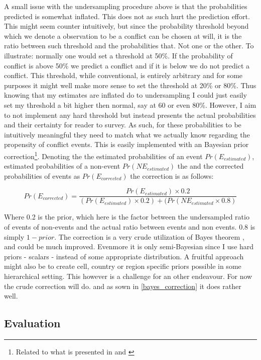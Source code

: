 \documentclass[a4paper]{article}
\begin{document}
A small issue with the undersampling procedure above is that the probabilities predicted is somewhat inflated. This does not as such hurt the prediction effort. This might seem counter intuitively, but since the probability threshold beyond which we denote a observation to be a conflict can be chosen at will, it is the ratio between such threshold and the probabilities that. Not one or the other. To illustrate: normally one would set a threshold at 50\%. If the probability of conflict is above 50\% we predict a conflict and if it is below we do not predict a conflict. This threshold, while conventional, is entirely arbitrary and for some purposes it might well make more sense to set the threshold at 20\% or 80\%. Thus knowing that my estimates are inflated do to undersampling I could just easily set my threshold a bit higher then normal, say at 60 or even 80\%. However, I aim to not implement any hard threshold but instead presents the actual probabilities and their certainty for reader to survey. As such, for these probabilities to be intuitively meaningful they need to match what we actually know regarding the propensity of conflict events. This is easily implemented with an Bayesian prior correction\footnote{Related to what is presented in \cite{King_Zeng_2001, king_zeng_2001b} and \cite{Goldstone_2010}}. Denoting the the estimated probabilities of an event $Pr(E_{estimated})$, estimated probabilities of a non-event $Pr(NE_{estimated})$ the  and the corrected probabilities of events as $Pr(E_{corrected})$ the correction is as follows:

$$
Pr(E_{corrected}) = \frac{Pr(E_{estimated}) \times 0.2}{(Pr(E_{estimated}) \times 0.2)+(Pr(NE_{estimated} \times 0.8)}
$$

Where 0.2 is the prior, which here is the factor between the undersampled ratio of events of non-events and the actual ratio between events and non events. 0.8 is simply $1-prior$. The correction is a very crude utilization of Bayes theorem \citep[7-8]{Gelman_2013}, and could be much improved. Evenmore it is only semi-Bayesian since I use hard priors - scalars - instead of some appropriate distribution. A fruitful approach might also be to create cell, country or region specific priors possible in some hierarchical setting. This however is a challenge for an other endeavour. For now the crude correction will do. and as sown in \autoref{bayes_correction} it does rather well.\par

\subsection{Evaluation}
\end{document}
